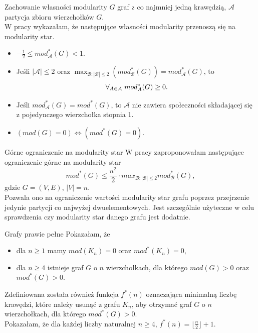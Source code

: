 \documentclass{beamer}
\begin{document}
\begin{frame}{Zachowanie własności modularity}
    \(G\) graf z co najmniej jedną krawędzią, \(\mathcal{A}\) partycja zbioru wierzchołków \(G\).\\
    \vspace{0.2cm}
    W pracy wykazałam, że następujące własności modularity przenoszą się na modularity star.
    \vspace{0.2cm}
    \begin{itemize}
        \item \(-\frac{1}{2} \leq mod_{\mathcal{A}}^*(G) < 1\).
        \item Jeśli \(|\mathcal{A}|\leq 2\)  oraz \(\displaystyle \max_{\mathcal{B}: |\mathcal{B}| \leq 2} (mod_{\mathcal{B}}^*(G)) = mod_{\mathcal{A}}^*(G)\), to
              \[\forall_{A \in \mathcal{A}} \hspace{1mm} mod_A^*(G) \geq 0 .\]
        \item Jeśli \(mod_{\mathcal{A}}^*(G) = mod^*(G)\), to \(\mathcal{A}\) nie zawiera społeczności składającej się z pojedynczego wierzchołka stopnia 1.
        \item \((mod(G) = 0) \Leftrightarrow (mod^*(G) = 0)\).
    \end{itemize}
\end{frame}

\begin{frame}{Górne ograniczenie na modularity star}
    W pracy zaproponowałam następujące ograniczenie górne na modularity star
    \[mod^*(G) \leq \frac{n^2}{2} \cdot max_{\mathcal{B}:|\mathcal{B}|\leq 2} mod_{\mathcal{B}}^*(G),\]
    gdzie \(G=(V,E)\), \(|V|=n\).\\
    \vspace{0.8cm}
    Pozwala ono na ograniczenie wartości modularity star grafu poprzez przejrzenie jedynie partycji co najwyżej dwuelementowych. Jest szczególnie użyteczne w celu sprawdzenia czy modularity star danego grafu jest dodatnie.\\

\end{frame}

\begin{frame}{Grafy prawie pełne}
    Pokazałam, że
    \begin{itemize}
        \item dla \(n \geq 1\) mamy \(mod(K_n) = 0\) oraz \(mod^*(K_n) = 0\),
        \item dla \(n \geq 4\) istnieje graf \(G\) o \(n\) wierzchołkach, dla którego \(mod(G) > 0\) oraz \(mod^*(G) > 0\).\\
    \end{itemize}
    \vspace{0.4cm}

    Zdefiniowana została również funkcja \(f^*(n)\) oznaczająca minimalną liczbę krawędzi, które należy usunąć z grafu \(K_n\), aby otrzymać graf \(G\) o \(n\) wierzchołkach, dla którego \(mod^*(G) > 0\).\\
    \vspace{0.4cm}
    Pokazałam, że dla każdej liczby naturalnej \(n \geq 4\), \(f^*(n) = \lfloor\frac{n}{2}\rfloor + 1\).
\end{frame}
\end{document}
